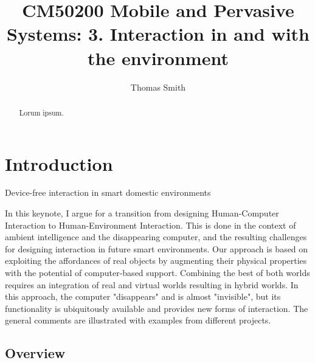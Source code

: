 \documentclass[oribibl]{llncs}
\begin{document}
\title{CM50200 Mobile and Pervasive Systems: 3. Interaction in and with the environment}


\author{Thomas Smith}
\maketitle

\begin{abstract}
Lorum ipsum.
\end{abstract}

\section{Introduction}

Device-free interaction in smart domestic environments \cite{Heidrich:2013:DIS:2459236.2459248}

In this keynote, I argue for a transition from designing Human-Computer Interaction to Human-Environment Interaction. This is done in the context of ambient intelligence and the disappearing computer, and the resulting challenges for designing interaction in future smart environments. Our approach is based on exploiting the affordances of real objects by augmenting their physical properties with the potential of computer-based support. Combining the best of both worlds requires an integration of real and virtual worlds resulting in hybrid worlds. In this approach, the computer "disappears" and is almost "invisible", but its functionality is ubiquitously available and provides new forms of interaction. The general comments are illustrated with examples from different projects. \cite{Streitz:2006:HIH:1783789.1783791}

\subsection{Overview}
\end{document}
